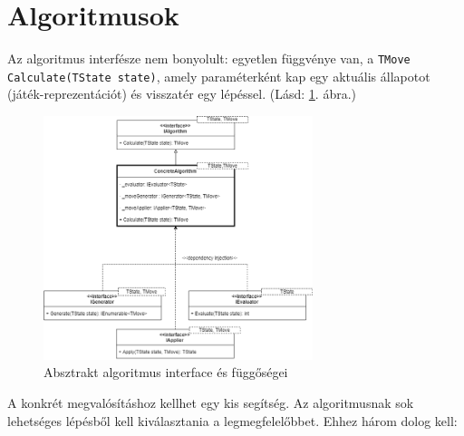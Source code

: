 \documentclass[twoside, a4paper, 12pt]{book}
\begin{document}
\section{Algoritmusok}
Az algoritmus interfésze nem bonyolult: egyetlen függvénye van, a \texttt{TMove Calculate(TState state)}, amely paraméterként kap egy aktuális állapotot (játék-reprezentációt) és visszatér egy lépéssel. (Lásd: \ref{fig:algorithmAbstractDiagram}. ábra.)

\begin{figure}[htbp]
	\centering
	\includegraphics[width=0.7\textwidth]{img/algorithmAbstractDiagram.png}
	\caption{Absztrakt algoritmus interface és függőségei}
	\label{fig:algorithmAbstractDiagram}
\end{figure}

A konkrét megvalósításhoz kellhet egy kis segítség. Az algoritmusnak sok lehetséges lépésből kell kiválasztania a legmegfelelőbbet. Ehhez három dolog kell:
\end{document}

